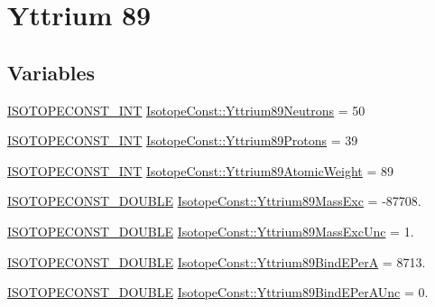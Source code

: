 \hypertarget{group___isotope_const-_yttrium-_y89}{}\section{Yttrium 89}
\label{group___isotope_const-_yttrium-_y89}
\subsection*{Variables}
\begin{DoxyCompactItemize}
\item 
\mbox{\hyperlink{group___isotope_const-_macros_ga5f18360b3e99483a35c32d789e62621c}{I\+S\+O\+T\+O\+P\+E\+C\+O\+N\+S\+T\+\_\+\+I\+NT}} \mbox{\hyperlink{group___isotope_const-_yttrium-_y89_gade61dd655f1c74c8f0a1508120f0309d}{Isotope\+Const\+::\+Yttrium89\+Neutrons}} = 50
\item 
\mbox{\hyperlink{group___isotope_const-_macros_ga5f18360b3e99483a35c32d789e62621c}{I\+S\+O\+T\+O\+P\+E\+C\+O\+N\+S\+T\+\_\+\+I\+NT}} \mbox{\hyperlink{group___isotope_const-_yttrium-_y89_gac3ea74b9f836a042c6107b9ff23c240e}{Isotope\+Const\+::\+Yttrium89\+Protons}} = 39
\item 
\mbox{\hyperlink{group___isotope_const-_macros_ga5f18360b3e99483a35c32d789e62621c}{I\+S\+O\+T\+O\+P\+E\+C\+O\+N\+S\+T\+\_\+\+I\+NT}} \mbox{\hyperlink{group___isotope_const-_yttrium-_y89_gadb26df303d32aef37e64fee716b3f65b}{Isotope\+Const\+::\+Yttrium89\+Atomic\+Weight}} = 89
\item 
\mbox{\hyperlink{group___isotope_const-_macros_ga8f45a7272ce02c0b4c65c44636ed719a}{I\+S\+O\+T\+O\+P\+E\+C\+O\+N\+S\+T\+\_\+\+D\+O\+U\+B\+LE}} \mbox{\hyperlink{group___isotope_const-_yttrium-_y89_ga967d52eaa35bfc2abf1818ae1f2d9e23}{Isotope\+Const\+::\+Yttrium89\+Mass\+Exc}} = -\/87708.
\item 
\mbox{\hyperlink{group___isotope_const-_macros_ga8f45a7272ce02c0b4c65c44636ed719a}{I\+S\+O\+T\+O\+P\+E\+C\+O\+N\+S\+T\+\_\+\+D\+O\+U\+B\+LE}} \mbox{\hyperlink{group___isotope_const-_yttrium-_y89_ga209fe4a0cfd61ab9266b3f00703592dd}{Isotope\+Const\+::\+Yttrium89\+Mass\+Exc\+Unc}} = 1.
\item 
\mbox{\hyperlink{group___isotope_const-_macros_ga8f45a7272ce02c0b4c65c44636ed719a}{I\+S\+O\+T\+O\+P\+E\+C\+O\+N\+S\+T\+\_\+\+D\+O\+U\+B\+LE}} \mbox{\hyperlink{group___isotope_const-_yttrium-_y89_ga0315cbe91807924138842a97229e62ef}{Isotope\+Const\+::\+Yttrium89\+Bind\+E\+PerA}} = 8713.
\item 
\mbox{\hyperlink{group___isotope_const-_macros_ga8f45a7272ce02c0b4c65c44636ed719a}{I\+S\+O\+T\+O\+P\+E\+C\+O\+N\+S\+T\+\_\+\+D\+O\+U\+B\+LE}} \mbox{\hyperlink{group___isotope_const-_yttrium-_y89_ga9eb7b70a32bdf827c41c6750b4b54ac2}{Isotope\+Const\+::\+Yttrium89\+Bind\+E\+Per\+A\+Unc}} = 0.

\end{DoxyCompactItemize}
